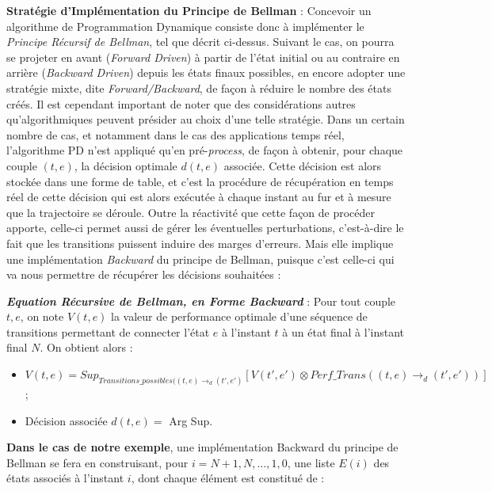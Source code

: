 \textbf{Stratégie d'Implémentation du Principe de Bellman} : Concevoir un algorithme de Programmation Dynamique consiste donc à implémenter le \textit{Principe Récursif de Bellman}, tel que décrit ci-dessus. Suivant le cas, on pourra se projeter en avant (\textit{Forward Driven}) à partir de l'état initial ou au contraire en arrière (\textit{Backward Driven}) depuis les états finaux possibles, en encore adopter une stratégie mixte, dite \textit{Forward/Backward}, de façon à réduire le nombre des états créés. Il est cependant important de noter que des considérations autres qu'algorithmiques peuvent présider au choix d'une telle stratégie. Dans un certain nombre de cas, et notamment dans le cas des applications temps réel, l'algorithme PD n'est appliqué qu'en pré-\textit{process}, de façon à obtenir, pour chaque couple $(t, e)$, la décision optimale $d(t, e)$ associée. Cette décision est alors stockée dans une forme de table, et c'est la procédure de récupération en temps réel de cette décision qui est alors exécutée à chaque instant au fur et à mesure que la trajectoire se déroule. Outre la réactivité que cette façon de procéder apporte, celle-ci permet aussi de gérer les éventuelles perturbations, c'est-à-dire le fait que les transitions puissent induire des marges d'erreurs. Mais elle implique une implémentation \textit{Backward} du principe de Bellman, puisque c'est celle-ci qui va nous permettre de récupérer les décisions souhaitées :
 
\textit{\textbf{Equation Récursive de Bellman, en Forme Backward}} : Pour tout couple $t, e$, on note $V(t, e)$ la valeur de performance optimale d'une séquence de transitions permettant de connecter l'état $e$ à l'instant $t$ à un état final à l'instant final $N$. On obtient alors :
   
\begin{itemize}[label=$\square$]
	
	\item 	$V(t, e) = Sup_{Transitions\_possibles ((t, e) \rightarrow_{d} (t', e')}  [V(t', e') \otimes Perf\_Trans((t, e) \rightarrow_{d} (t', e'))] $ ;
	\item 	Décision associée $d(t, e) =$ Arg Sup.
\end{itemize}
 
\textbf{Dans le cas de notre exemple}, une implémentation Backward du principe de Bellman se fera en construisant, pour $i = N+1, N,\dots, 1, 0$, une liste $E(i)$ des états associés à l'instant $i$, dont chaque élément est constitué de :


